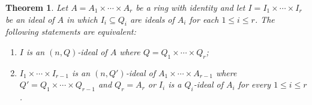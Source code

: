 \documentclass[preprint,review,10pt]{amsart}
\newtheorem{theorem}{Theorem}[section]
\theoremstyle{definition}
\theoremstyle{remark}
\numberwithin{equation}{section}
\begin{document}
\begin{theorem}\label{7} 
Let $A = A_1 \times \cdots \times A_r$ be a ring with identity and let  $I=I_1  \times \cdots \times I_r$ be  an ideal of $A$ in which  $I_i \subseteq Q_i$ are ideals of $A_i$ for each $1 \le i \le r$. The following statements are equivalent:
 \begin{enumerate}
  \item[(1)] $I$ is an $(n,Q)$-ideal of $A$ where $Q =Q_1 \times \cdots \times Q_{r}$; 
 \item[(2)] $I_1  \times \cdots \times I_{r-1}$ is an $(n,Q')$-ideal of $A_1 \times   \cdots \times A_{r-1}$ where $Q'=Q_1 \times \cdots \times Q_{r-1}$ and $Q_r = A_r$   or   $I_i$ is a $Q_i$-ideal of $A_i$ for every $1 \le i \le r$. 
 \end{enumerate}
 \end{theorem}
\end{document}
